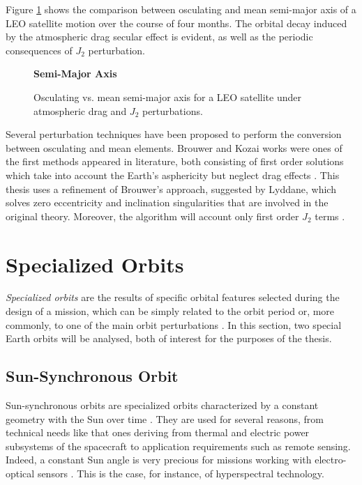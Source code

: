Figure \ref{osc_vs_mean_sma} shows the comparison between osculating and mean semi-major axis of a LEO satellite motion over the course of four months.
The orbital decay induced by the atmospheric drag secular effect is evident, as well as the periodic consequences of $J_2$ perturbation.
\begin{figure}[h] 
    \begin{center}
        \textbf{Semi-Major Axis}\par\medskip
    \end{center}
    \caption{Osculating vs. mean semi-major axis for a LEO satellite under atmospheric drag and $J_2$ perturbations.}
    \label{osc_vs_mean_sma}
\end{figure}

Several perturbation techniques have been proposed to perform the conversion between osculating and mean elements. 
Brouwer and Kozai works were ones of the first methods appeared in literature, both consisting of first order solutions which take into account the Earth's asphericity but neglect drag effects \cite{arnas2022analytic}.
This thesis uses a refinement of Brouwer's approach, suggested by Lyddane, which solves zero eccentricity and inclination singularities that are involved in the original theory.
Moreover, the algorithm will account only first order $J_2$ terms \cite{schaub2002analytical}.

\section{Specialized Orbits}
\textit{Specialized orbits} are the results of specific orbital features selected during the design of a mission, which can be simply related to the orbit period or, more commonly, to one of the main orbit perturbations \cite{wertz2009orbit}. 
In this section, two special Earth orbits will be analysed, both of interest for the purposes of the thesis.

\subsection{Sun-Synchronous Orbit} \label{sso_paragraph}
Sun-synchronous orbits are specialized orbits characterized by a constant geometry with the Sun over time \cite{vallado2013fundamentals}. 
They are used for several reasons, from technical needs like that ones deriving from thermal and electric power subsystems of the spacecraft to application requirements such as remote sensing.
Indeed, a constant Sun angle is very precious for missions working with electro-optical sensors \cite{brown1998spacecraft}.
This is the case, for instance, of hyperspectral technology. 

